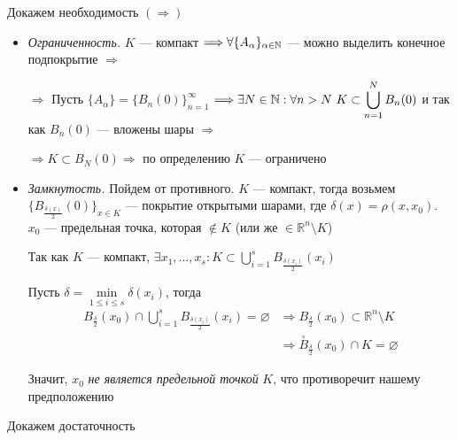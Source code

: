 \documentclass[a4paper]{article}
\begin{document}
\proof Докажем необходимость $(\Longrightarrow)$
\begin{itemize}
    \item \textit{Ограниченность.} $K$ — компакт $\Longrightarrow \forall \{A_\alpha\}_{\alpha\in\operatorname{\mathbb{N}}}$ — можно выделить конечное подпокрытие $\Longrightarrow$

    $\Longrightarrow$ Пусть $\{A_\alpha\}=\{B_n(0)\}_{n=1}^\infty$ $\Longrightarrow \exists N \in \operatorname{\mathbb{N}} : \forall n > N ~ K \subset \displaystyle\bigcup_{n=1}^N B_n(0)$ и так как $B_n(0)$ — вложены шары $\Longrightarrow$

    $\Longrightarrow K \subset B_N(0) \Longrightarrow$ по определению $K$ — ограничено

    \begin{center}
       
    \end{center}


    \item \textit{Замкнутость.} Пойдем от противного. $K$ — компакт, тогда возьмем $\{B_{\frac{\delta(x)}{2}}(0)\}_{x\in K}$ — покрытие открытыми шарами, где $\delta(x)=\rho(x,x_0)$. $x_0$ — предельная точка, которая $\notin K$ (или же $\in \mathbb{R}^n\setminus K$)

    Так как $K$ — компакт, $\exists x_1,\ldots, x_s:K\subset\displaystyle\bigcup_{i=1}^{s} B_{\frac{\delta(x_i)}{2}}(x_i)$

    Пусть $\delta=\min\limits_{1\leqslant i\leqslant s}{\delta(x_i)}$, тогда
    \begin{equation*}
        \begin{aligned}
            B_{\frac{\delta}{2}}(x_0)\cap\bigcup_{i=1}^{s}B_{\frac{\delta(x_i)}{2}}(x_i)=\varnothing&\Longrightarrow B_{\frac{\delta}{2}}(x_0)\subset\mathbb{R}^n\setminus K\\
            &\Longrightarrow\stackrel{\circ}{B}_{\frac{\delta}{2}}(x_0)\cap K=\varnothing
        \end{aligned}
    \end{equation*}

    Значит, $x_0$ \textit{не является предельной точкой} $K$, что противоречит нашему предположению

    \begin{center}
        
    \end{center}


\end{itemize}

\proof Докажем достаточность
\end{document}
